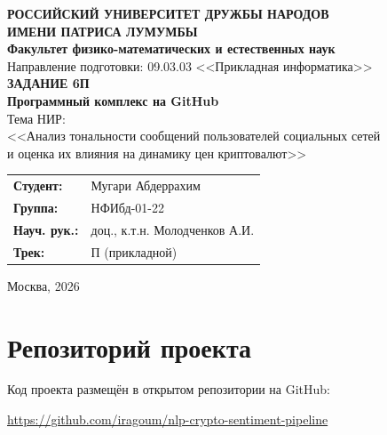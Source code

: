 \documentclass[a4paper,12pt]{article}
\begin{document}

\begin{titlepage}
\begin{center}

\textbf{РОССИЙСКИЙ УНИВЕРСИТЕТ ДРУЖБЫ НАРОДОВ\\ИМЕНИ ПАТРИСА ЛУМУМБЫ}\\[0.3cm]
\textbf{Факультет физико-математических и естественных наук}\\[0.3cm]
Направление подготовки: 09.03.03 <<Прикладная информатика>>\\[2cm]

{\Large \textbf{ЗАДАНИЕ 6П}}\\[0.5cm]
{\large \textbf{Программный комплекс на GitHub}}\\[1cm]

{\large Тема НИР:}\\[0.3cm]
{\large <<Анализ тональности сообщений пользователей социальных сетей\\
и оценка их влияния на динамику цен криптовалют>>}\\[2cm]

\begin{tabular}{ll}
\textbf{Студент:} & Мугари Абдеррахим \\
\textbf{Группа:} & НФИбд-01-22 \\
\textbf{Науч. рук.:} & доц., к.т.н. Молодченков А.И. \\
\textbf{Трек:} & П (прикладной) \\
\end{tabular}

\vfill
Москва, 2026

\end{center}
\end{titlepage}

\tableofcontents
\newpage


\section{Репозиторий проекта}

Код проекта размещён в открытом репозитории на GitHub:

\begin{center}
\url{https://github.com/iragoum/nlp-crypto-sentiment-pipeline}
\end{center}
\end{document}
